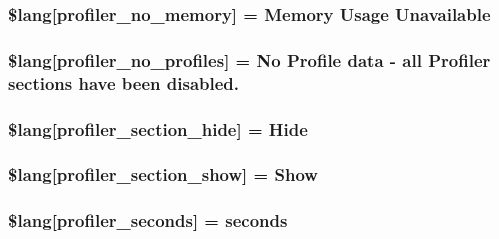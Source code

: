 \subsubsection[{\$lang}]{\setlength{\rightskip}{0pt plus 5cm}\$lang\mbox{[}\textquotesingle{}profiler\+\_\+no\+\_\+memory\textquotesingle{}\mbox{]} = \textquotesingle{}Memory Usage Unavailable\textquotesingle{}}\label{profiler__lang_8php_a32345afdaa3f160ba1d21d03223313ad}
\hypertarget{profiler__lang_8php_aabea841eed12fa8271f13656fa7d5457}{}
\subsubsection[{\$lang}]{\setlength{\rightskip}{0pt plus 5cm}\$lang\mbox{[}\textquotesingle{}profiler\+\_\+no\+\_\+profiles\textquotesingle{}\mbox{]} = \textquotesingle{}No Profile data -\/ all Profiler sections have been disabled.\textquotesingle{}}\label{profiler__lang_8php_aabea841eed12fa8271f13656fa7d5457}
\hypertarget{profiler__lang_8php_a137158ebe1d58bd53bbbb4594f2bc0ed}{}
\subsubsection[{\$lang}]{\setlength{\rightskip}{0pt plus 5cm}\$lang\mbox{[}\textquotesingle{}profiler\+\_\+section\+\_\+hide\textquotesingle{}\mbox{]} = \textquotesingle{}Hide\textquotesingle{}}\label{profiler__lang_8php_a137158ebe1d58bd53bbbb4594f2bc0ed}
\hypertarget{profiler__lang_8php_a3e3b1984f57780efbdaf6d01dac31f3c}{}
\subsubsection[{\$lang}]{\setlength{\rightskip}{0pt plus 5cm}\$lang\mbox{[}\textquotesingle{}profiler\+\_\+section\+\_\+show\textquotesingle{}\mbox{]} = \textquotesingle{}Show\textquotesingle{}}\label{profiler__lang_8php_a3e3b1984f57780efbdaf6d01dac31f3c}
\hypertarget{profiler__lang_8php_a6d6060d6ca0da3c1e6d4168914d7e362}{}
\subsubsection[{\$lang}]{\setlength{\rightskip}{0pt plus 5cm}\$lang\mbox{[}\textquotesingle{}profiler\+\_\+seconds\textquotesingle{}\mbox{]} = \textquotesingle{}seconds\textquotesingle{}}\label{profiler__lang_8php_a6d6060d6ca0da3c1e6d4168914d7e362}
